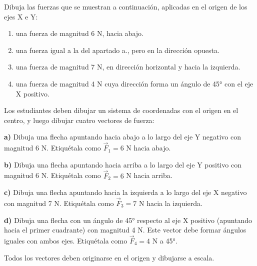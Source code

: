 \begin{exercise}
    Dibuja las fuerzas que se muestran a continuación, aplicadas en el origen de los ejes X e Y:
    \begin{enumerate}[label=\letraminuscula]
        \item una fuerza de magnitud 6 N, hacia abajo.
        \item una fuerza igual a la del apartado a., pero en la dirección opuesta.
        \item una fuerza de magnitud 7 N, en dirección horizontal y hacia la izquierda.
        \item una fuerza de magnitud 4 N cuya dirección forma un ángulo de 45° con el eje X positivo.
    \end{enumerate}


    \begin{solu}
        Los estudiantes deben dibujar un sistema de coordenadas con el origen en el centro, y luego dibujar cuatro vectores de fuerza:

        \textbf{a)} Dibuja una flecha apuntando hacia abajo a lo largo del eje Y negativo con magnitud 6 N. Etiquétala como $\vec{F}_1 = 6$ N hacia abajo.

        \textbf{b)} Dibuja una flecha apuntando hacia arriba a lo largo del eje Y positivo con magnitud 6 N. Etiquétala como $\vec{F}_2 = 6$ N hacia arriba.

        \textbf{c)} Dibuja una flecha apuntando hacia la izquierda a lo largo del eje X negativo con magnitud 7 N. Etiquétala como $\vec{F}_3 = 7$ N hacia la izquierda.

        \textbf{d)} Dibuja una flecha con un ángulo de 45° respecto al eje X positivo (apuntando hacia el primer cuadrante) con magnitud 4 N. Este vector debe formar ángulos iguales con ambos ejes. Etiquétala como $\vec{F}_4 = 4$ N a 45°.

        Todos los vectores deben originarse en el origen y dibujarse a escala.
    \end{solu}
\end{exercise}


